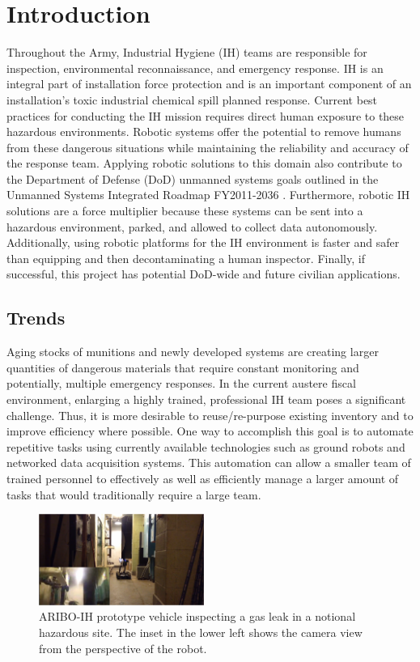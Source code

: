 \section{Introduction}\label{sec:introduction}

Throughout the Army, Industrial Hygiene (IH) teams are responsible for inspection, environmental reconnaissance, and emergency response. IH is an integral part of installation force protection and is an important component of an installation’s toxic industrial chemical spill planned response. Current best practices for conducting the IH mission requires direct human exposure to these hazardous environments. Robotic systems offer the potential to remove humans from these dangerous situations while maintaining the reliability and accuracy of the response team. Applying robotic solutions to this domain also contribute to the Department of Defense (DoD) unmanned systems goals outlined in the Unmanned Systems Integrated Roadmap FY2011-2036 \cite{roadmap}. Furthermore, robotic IH solutions are a force multiplier because these systems can be sent into a hazardous environment, parked, and allowed to collect data autonomously. Additionally, using robotic platforms for the IH environment is faster and safer than equipping and then decontaminating a human inspector. Finally, if successful, this project has potential DoD-wide and future civilian applications. 

\subsection{Trends}

Aging stocks of munitions and newly developed systems are creating larger quantities of dangerous materials that require constant monitoring and potentially, multiple emergency responses. In the current austere fiscal environment, enlarging a highly trained, professional IH team poses a significant challenge. Thus, it is more desirable to reuse/re-purpose existing inventory and to improve efficiency where possible.  One way to accomplish this goal is to automate repetitive tasks using currently available technologies such as ground robots and networked data acquisition systems. This automation can allow a smaller team of trained personnel to effectively as well as efficiently manage a larger amount of tasks that would traditionally require a large team.

\begin{figure}
	\centering
	\includegraphics[width=0.48\textwidth]{./pictures/concept}
	\caption{ARIBO-IH prototype vehicle inspecting a gas leak in a notional hazardous site. The inset in the lower left shows the camera view from the perspective of the robot.}
	\label{fig:concept}
\end{figure}

